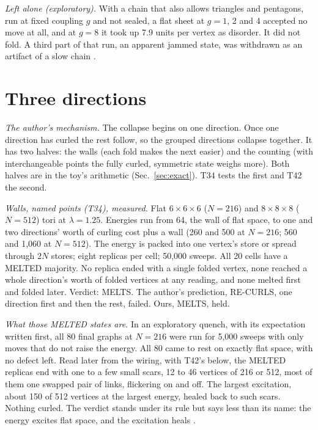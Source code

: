 \documentclass[aps,pre,10pt,twocolumn,superscriptaddress,nofootinbib]{revtex4-2}
\begin{document}
\emph{Left alone (exploratory).} With a chain that also allows triangles and pentagons, run at fixed coupling $g$
and not sealed, a flat sheet at $g = 1$, 2 and 4 accepted no move at all, and at $g = 8$ it took up 7.9 units per
vertex as disorder. It did not fold. A third part of that run, an apparent jammed state, was withdrawn as an
artifact of a slow chain \cite{repo}.

\section{Three directions}\label{sec:three}

\emph{The author's mechanism.} The collapse begins on one direction. Once one direction has curled the rest follow,
so the grouped directions collapse together. It has two halves: the walls (each fold makes the next easier) and the
counting (with interchangeable points the fully curled, symmetric state weighs more). Both halves are in the toy's
arithmetic (Sec.~\ref{sec:exact}). T34 tests the first and T42 the second.

\emph{Walls, named points (T34), measured.} Flat $6 \times 6 \times 6$ ($N = 216$) and $8 \times 8 \times 8$ ($N =
512$) tori at $\lambda = 1.25$. Energies run from 64, the wall of flat space, to one and two
directions' worth of curling cost plus a wall (260 and 500 at $N = 216$; 560 and 1,060 at $N = 512$). The energy is
packed into one vertex's store or spread through $2N$ stores; eight replicas per cell; 50,000 sweeps. All 20 cells
have a MELTED majority. No replica ended with a single folded vertex, none reached a whole direction's worth of
folded vertices at any reading, and none melted first and folded later. Verdict: MELTS. The author's prediction,
RE-CURLS, one direction first and then the rest, failed. Ours, MELTS, held.

\emph{What those MELTED states are.} In an exploratory quench, with its expectation written first, all 80 final
graphs at $N = 216$ were run for 5,000 sweeps with only moves that do not raise the energy. All 80 came to rest on
exactly flat space, with no defect left. Read later from the wiring, with T42's below, the MELTED replicas
end with one to a few small scars, 12 to 46 vertices of 216 or 512, most of them one swapped pair of links,
flickering on and off. The largest excitation, about 150 of 512 vertices at the largest energy, healed back to such
scars. Nothing curled. The verdict stands under its rule but says less than its name: the energy excites flat
space, and the excitation heals \cite{repo}.
\end{document}
